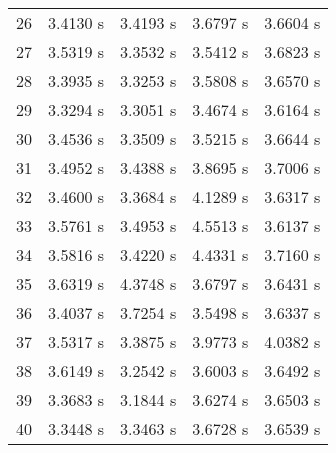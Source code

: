 \begin{table}
\begin{tabular}{cllll}
    26 &3.4130 s & 3.4193 s & 3.6797 s  & 3.6604 s \\
    27 &3.5319 s & 3.3532 s & 3.5412 s & 3.6823 s  \\
    28 &3.3935 s & 3.3253 s  & 3.5808 s & 3.6570 s \\
    29 &3.3294 s & 3.3051 s & 3.4674 s & 3.6164 s \\
    30 &3.4536 s  & 3.3509 s & 3.5215 s  & 3.6644 s \\
    31 &3.4952 s & 3.4388 s & 3.8695 s & 3.7006 s \\
    32 &3.4600 s & 3.3684 s & 4.1289 s & 3.6317 s \\
    33 &3.5761 s & 3.4953 s & 4.5513 s  & 3.6137 s \\
    34 &3.5816 s & 3.4220 s & 4.4331 s & 3.7160 s \\
    35 &3.6319 s & 4.3748 s & 3.6797 s & 3.6431 s \\
    36 &3.4037 s & 3.7254 s & 3.5498 s & 3.6337 s  \\
    37 &3.5317 s & 3.3875 s & 3.9773 s & 4.0382 s \\
    38 &3.6149 s & 3.2542 s & 3.6003 s & 3.6492 s \\
    39 &3.3683 s & 3.1844 s & 3.6274 s & 3.6503 s \\
    40 &3.3448 s & 3.3463 s & 3.6728 s & 3.6539 s
  \end{tabular}
\end{table}

